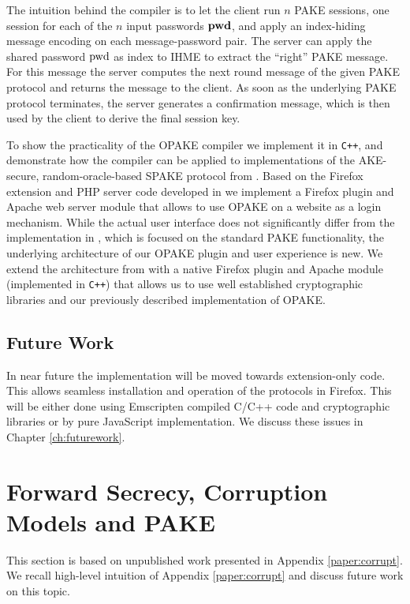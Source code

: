 The intuition behind the compiler is to let the client run $n$ \ac{PAKE} sessions, one session for each of the $n$ input passwords $\mathrm{{\bf pwd}}$, and apply an index-hiding message encoding on each message-password pair.
The server can apply the shared password $\mathrm{pwd}$ as index to \ac{IHME} to extract the ``right'' \ac{PAKE} message. 
For this message the server computes the next round message of the given \ac{PAKE} protocol and returns the message to the client.
As soon as the underlying \ac{PAKE} protocol terminates, the server generates a confirmation message, which is then used by the client to derive the final session key.

To show the practicality of the \ac{OPAKE} compiler we implement it in \verb/C++/, and demonstrate how the compiler can be applied to implementations of the \ac{AKE}-secure, random-oracle-based SPAKE protocol from \cite{Abdalla2005}.
Based on the Firefox extension and PHP server code developed in \cite{MSD13} we implement a Firefox plugin and Apache web server module that allows to use \ac{OPAKE} on a website as a login mechanism.
While the actual user interface does not significantly differ from the implementation in \cite{MSD13}, which is focused on the standard PAKE functionality, the underlying architecture of our \ac{OPAKE} plugin and user experience is new.
We extend the architecture from \cite{MSD13} with a native Firefox plugin and Apache module (implemented in \texttt{C++}) that allows us to use well established cryptographic libraries and our previously described implementation of \ac{OPAKE}.

\subsection{Future Work}
In near future the implementation will be moved towards extension-only code.
This allows seamless installation and operation of the protocols in Firefox.
This will be either done using Emscripten compiled C/C++ code and cryptographic libraries or by pure JavaScript implementation.
We discuss these issues in Chapter \ref{ch:futurework}.


\section{Forward Secrecy, Corruption Models and PAKE} \label{sec:corrupt}
This section is based on unpublished work presented in Appendix \ref{paper:corrupt}.
We recall high-level intuition of Appendix \ref{paper:corrupt} and discuss future work on this topic.

